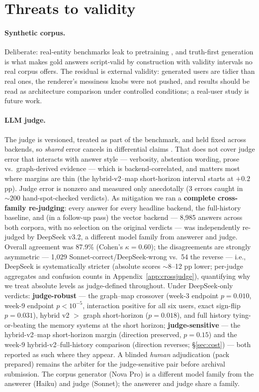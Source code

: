 \section{Threats to validity}
\label{sec:threats}

\paragraph{Synthetic corpus.} Deliberate: real-entity benchmarks leak to
pretraining \citep{xu2026memgym,xu2024contamination}, and truth-first
generation is what makes gold answers script-valid by construction with
validity intervals no real corpus offers. The residual is external validity:
generated users are tidier than real ones, the renderer's messiness knobs
were not pushed, and results should be read as architecture comparison under
controlled conditions; a real-user study is future work.

\paragraph{LLM judge.} The judge is versioned, treated as part of the
benchmark, and held fixed across backends, so \emph{shared} error cancels
in differential claims \citep{zheng2023judging,wang2024notfair}. That does
not cover judge error that interacts with answer style --- verbosity,
abstention wording, prose vs.\ graph-derived evidence --- which is
backend-correlated, and matters most where margins are thin (the
hybrid-v2--map short-horizon interval starts at $+0.2$ pp). Judge error is
nonzero and measured only anecdotally (3 errors caught in ${\sim}200$
hand-spot-checked verdicts). As mitigation we ran a \textbf{complete
cross-family re-judging}: every answer for every headline backend, the
full-history baseline, and (in a follow-up pass) the vector backend ---
8,985 answers across both corpora, with no selection on the original
verdicts --- was independently re-judged by DeepSeek v3.2, a different
model family from answerer and judge. Overall agreement was 87.9\%
(Cohen's $\kappa=0.60$); the disagreements are strongly asymmetric ---
1{,}029 Sonnet-correct/DeepSeek-wrong vs.\ 54 the reverse --- i.e.,
DeepSeek is systematically stricter (absolute scores ${\sim}8$--12 pp
lower; per-judge aggregates and confusion counts in
Appendix~\ref{app:crossjudge}), quantifying why we treat absolute levels
as judge-defined throughout. Under DeepSeek-only verdicts:
\textbf{judge-robust} --- the graph--map crossover (week-3 endpoint
$p=0.010$, week-9 endpoint $p<10^{-5}$, interaction positive for all six
users, exact sign-flip $p=0.031$), hybrid v2 $>$ graph short-horizon
($p=0.018$), and full history tying-or-beating the memory systems at the
short horizon; \textbf{judge-sensitive} --- the hybrid-v2--map
short-horizon margin (direction preserved, $p=0.15$) and the week-9
hybrid-v2--full-history comparison (direction reverses; \S\ref{sec:cost})
--- both reported as such where they appear. A blinded \emph{human}
adjudication (pack prepared) remains the arbiter for the judge-sensitive
pair before archival submission. The corpus generator (Nova Pro) is a
different model family from the answerer (Haiku) and judge (Sonnet); the
answerer and judge share a family.

